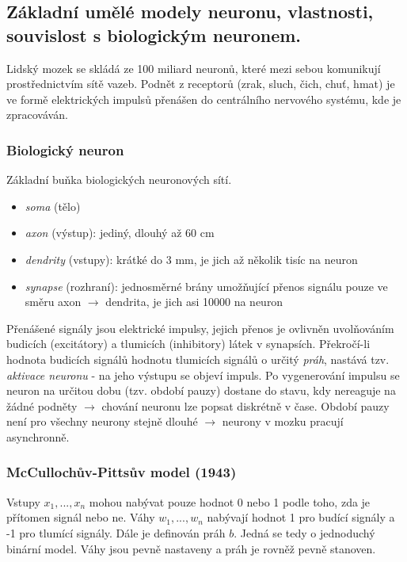 \subsection{Základní umělé modely neuronu, vlastnosti, souvislost s biologickým neuronem.}
Lidský mozek se skládá ze 100 miliard neuronů, které mezi sebou komunikují prostřednictvím sítě vazeb. Podnět z receptorů (zrak, sluch, čich, chuť, hmat) je ve formě elektrických impulsů přenášen do centrálního nervového systému, kde je zpracováván.

\subsubsection*{Biologický neuron}
Základní buňka biologických neuronových sítí.
\begin{itemize}
\item \textit{soma} (tělo)
\item \textit{axon} (výstup): jediný, dlouhý až 60 cm
\item \textit{dendrity} (vstupy): krátké do 3 mm, je jich až několik tisíc na neuron
\item \textit{synapse} (rozhraní): jednosměrné brány umožňující přenos signálu pouze ve směru axon $ \to $ dendrita, je jich asi 10000 na neuron
\end{itemize}
Přenášené signály jsou elektrické impulsy, jejich přenos je ovlivněn uvolňováním budicích (excitátory) a tlumicích (inhibitory) látek v synapsích. Překročí-li hodnota budicích signálů hodnotu tlumicích signálů o určitý \textit{práh}, nastává tzv. \textit{aktivace neuronu} - na jeho výstupu se objeví impuls. Po vygenerování impulsu se neuron na určitou dobu (tzv. období pauzy) dostane do stavu, kdy nereaguje na žádné podněty $ \to $ chování neuronu lze popsat diskrétně v čase. Období pauzy není pro všechny neurony stejně dlouhé $ \to $ neurony v mozku pracují asynchronně.

\subsubsection*{McCullochův-Pittsův model (1943)}
Vstupy $ x_1,...,x_n $ mohou nabývat pouze hodnot 0 nebo 1 podle toho, zda je přítomen signál nebo ne. Váhy $ w_1,...,w_n $ nabývají hodnot 1 pro budící signály a -1 pro tlumící signály. Dále je definován práh $ b $. Jedná se tedy o jednoduchý binární model. Váhy jsou pevně nastaveny a práh je rovněž pevně stanoven.

